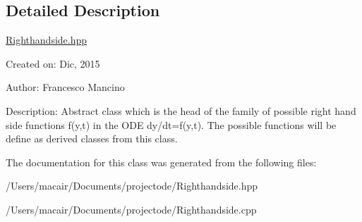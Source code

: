 \subsection{Detailed Description}
\hyperlink{_righthandside_8hpp_source}{Righthandside.\+hpp}

Created on\+: Dic, 2015 \begin{DoxyVerb}Author: Francesco Mancino
\end{DoxyVerb}


Description\+: Abstract class which is the head of the family of possible right hand side functions f(y,t) in the O\+D\+E dy/dt=f(y,t). The possible functions will be define as derived classes from this class. 

The documentation for this class was generated from the following files\+:\begin{DoxyCompactItemize}
\item 
/\+Users/macair/\+Documents/projectode/Righthandside.\+hpp\item 
/\+Users/macair/\+Documents/projectode/Righthandside.\+cpp\end{DoxyCompactItemize}
